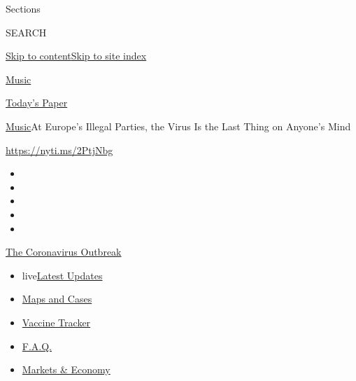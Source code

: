 Sections

SEARCH

\protect\hyperlink{site-content}{Skip to
content}\protect\hyperlink{site-index}{Skip to site index}

\href{https://www.nytimes3xbfgragh.onion/section/arts/music}{Music}

\href{https://myaccount.nytimes3xbfgragh.onion/auth/login?response_type=cookie\&client_id=vi}{}

\href{https://www.nytimes3xbfgragh.onion/section/todayspaper}{Today's
Paper}

\href{/section/arts/music}{Music}\textbar{}At Europe's Illegal Parties,
the Virus Is the Last Thing on Anyone's Mind

\url{https://nyti.ms/2PtjNbg}

\begin{itemize}
\item
\item
\item
\item
\item
\end{itemize}

\href{https://www.nytimes3xbfgragh.onion/news-event/coronavirus?action=click\&pgtype=Article\&state=default\&region=TOP_BANNER\&context=storylines_menu}{The
Coronavirus Outbreak}

\begin{itemize}
\tightlist
\item
  live\href{https://www.nytimes3xbfgragh.onion/2020/08/07/world/covid-19-news.html?action=click\&pgtype=Article\&state=default\&region=TOP_BANNER\&context=storylines_menu}{Latest
  Updates}
\item
  \href{https://www.nytimes3xbfgragh.onion/interactive/2020/us/coronavirus-us-cases.html?action=click\&pgtype=Article\&state=default\&region=TOP_BANNER\&context=storylines_menu}{Maps
  and Cases}
\item
  \href{https://www.nytimes3xbfgragh.onion/interactive/2020/science/coronavirus-vaccine-tracker.html?action=click\&pgtype=Article\&state=default\&region=TOP_BANNER\&context=storylines_menu}{Vaccine
  Tracker}
\item
  \href{https://www.nytimes3xbfgragh.onion/interactive/2020/world/coronavirus-tips-advice.html?action=click\&pgtype=Article\&state=default\&region=TOP_BANNER\&context=storylines_menu}{F.A.Q.}
\item
  \href{https://www.nytimes3xbfgragh.onion/live/2020/08/07/business/stock-market-today-coronavirus?action=click\&pgtype=Article\&state=default\&region=TOP_BANNER\&context=storylines_menu}{Markets
  \& Economy}
\end{itemize}


